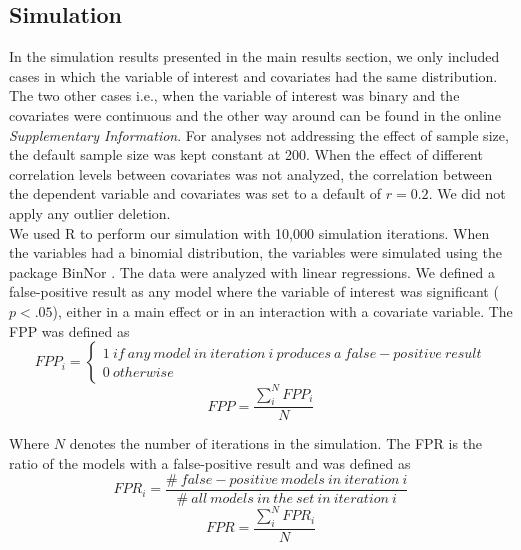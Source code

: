 \subsection{Simulation}
In the simulation results presented in the main results section, we only included cases in which the variable of interest and covariates had the same distribution. The two other cases i.e., when the variable of interest was binary and the covariates were continuous and the other way around can be found in the online \textit{Supplementary Information}. For analyses not addressing the effect of sample size, the default sample size was kept constant at 200. When the effect of different correlation levels between covariates was not analyzed, the correlation between the dependent variable and covariates was set to a default of $r=0.2$. We did not apply any outlier deletion.\\
We used R \citep{Team2018} to perform our simulation with 10,000 simulation iterations. When the variables had a binomial distribution, the variables were simulated using the package BinNor \citep{Demirtas2014}. The data were analyzed with linear regressions. We defined a false-positive result as any model where the variable of interest was significant ($p < .05$), either in a main effect or in an interaction with a covariate variable. The FPP was defined as \\

\[FPP_i=\left. \left\{\begin{array}{c}
1\ if\ any\ model\ in\ iteration\ i\ produces\ a\ false-positive\ result \\ 
0\ otherwise\  \end{array}
\right.\] 
\[FPP=\frac{\sum_{i}^{N}{FPP_i}}{N}\] 

Where  $N$ denotes the number of iterations in the simulation. The FPR is the ratio of the models with a false-positive result and was defined as \\

\[FPR_i=\frac{\#\ false-positive\ models\ in\ iteration\ i}{\#\ all\ models\ in\ the\ set\ in\ iteration\ i}\] 
\[FPR=\frac{\sum_{i}^{N}{FPR_i}}{N}\] 

